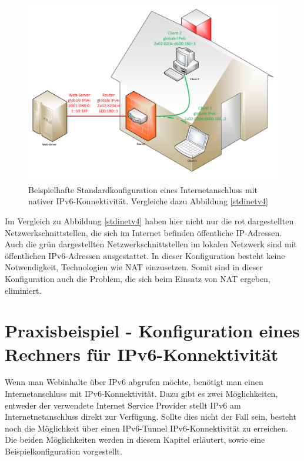 \documentclass[a4paper,12pt]{scrartcl}
\begin{document}
\begin{figure}[htb]
\begin{center}
 \includegraphics[width=.9\hsize]{./Zeichnungen/IPv6.pdf}
 \end{center}
\caption[Beispielhafte Standardkonfiguration eines Internetanschluss mit nativer IPv6-Konnektivit\"at, Quelle: Autor, verwendete Symbole unterliegen der
GPL]{\label{stdinet}Beispielhafte Standardkonfiguration eines Internetanschluss mit nativer IPv6-Konnektivit\"at. Vergleiche dazu Abbildung \ref{stdinetv4}}
\end{figure}

Im Vergleich zu Abbildung \ref{stdinetv4} haben hier nicht nur die rot dargestellten Netzwerkschnittstellen, die sich im Internet befinden öffentliche IP-Adressen. Auch die grün dargestellten Netzwerkschnittstellen im lokalen Netzwerk sind mit öffentlichen IPv6-Adressen ausgestattet. In dieser Konfiguration besteht keine Notwendigkeit, Technologien wie NAT einzusetzen. Somit sind in dieser Konfiguration auch die Problem, die sich beim Einsatz von NAT ergeben, eliminiert. 

\clearpage
\section{Praxisbeispiel - Konfiguration eines Rechners für IPv6-Konnektivität}
\label{sec:4}
Wenn man  Webinhalte \"uber IPv6 abgrufen m\"ochte, ben\"otigt man einen Internetanschluss mit IPv6-Konnektivit\"at. Dazu gibt es zwei M\"oglichkeiten, entweder der verwendete Internet Service Provider stellt IPv6 am Internetnetanschluss direkt zur Verf\"ugung. Sollte dies nicht der Fall sein, besteht noch die Möglichkeit über einen IPv6-Tunnel IPv6-Konnektivität zu erreichen. Die beiden M\"oglichkeiten werden in diesem Kapitel erläutert, sowie eine Beispielkonfiguration vorgestellt.
\end{document}
